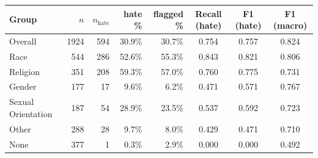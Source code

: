 \begin{tabular}{lrrrrccc}
\toprule
Group & $n$ & $n_\text{hate}$ & hate \% & flagged \% & Recall (hate) & F1 (hate) & F1 (macro) \\
\midrule
Overall & 1924 & 594 & 30.9\% & 30.7\% & 0.754 & 0.757 & 0.824 \\
Race & 544 & 286 & 52.6\% & 55.3\% & 0.843 & 0.821 & 0.806 \\
Religion & 351 & 208 & 59.3\% & 57.0\% & 0.760 & 0.775 & 0.731 \\
Gender & 177 & 17 & 9.6\% & 6.2\% & 0.471 & 0.571 & 0.767 \\
Sexual Orientation & 187 & 54 & 28.9\% & 23.5\% & 0.537 & 0.592 & 0.723 \\
Other & 288 & 28 & 9.7\% & 8.0\% & 0.429 & 0.471 & 0.710 \\
None & 377 & 1 & 0.3\% & 2.9\% & 0.000 & 0.000 & 0.492 \\
\bottomrule
\end{tabular}
